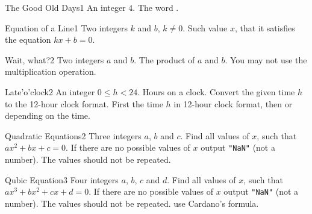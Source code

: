 \begin{task}{The Good Old Days}{1}
\In
An integer $4$.
\Out
The word .

\begin{ExampleIO}
\end{ExampleIO}
\end{task}

\begin{task}{Equation of a Line}{1}
\In
Two integers $k$ and $b$, $k \neq 0$.
\Out
Such value $x$, that it satisfies the equation $kx+b=0$. 
\end{task}

\begin{task}{Wait, what?}{2}
\In
Two integers $a$ and $b$.
\Out
The product of $a$ and $b$.
\Note
You may not use the multiplication operation.

\begin{ExampleIO}
\end{ExampleIO}
\end{task}

\begin{task}{Late'o'clock}{2}
\In An integer $0 \leq h < 24$. Hours on a clock.
\Note Convert the given time $h$ to the 12-hour clock format.
\Out First the time $h$ in 12-hour clock format, then  or 
depending on the time.

\begin{ExampleIO}
\end{ExampleIO}

\end{task}

\begin{task}{Quadratic Equations}{2}
\In
Three integers $a$, $b$ and $c$.
\Out
Find all values of $x$, such that $ax^2 + bx + c=0$. 
\Note
If there are no possible values of $x$ output \texttt{"NaN"} (not a number). 
The values should not be repeated.

\begin{ExampleIO}
\end{ExampleIO}

\end{task}

\begin{task}{Qubic Equation}{3}
\In
Four integers $a$, $b$, $c$ and $d$.
\Out
Find all values of $x$, such that $ax^3 + bx^2 + cx + d = 0$. 
\Note
If there are no possible values of $x$ output \texttt{"NaN"} (not a number). 
The values should not be repeated.
\Hint
use Cardano's formula.
\end{task}

